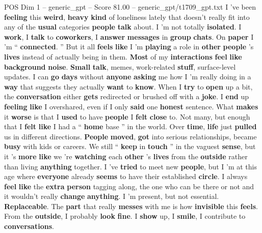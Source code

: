 \begin{textsample}{POS Dim 1 – generic\_gpt – Score 81.00 – generic\_gpt/t1709\_gpt.txt}  \label{ex:f1_pos_007}
I ’ve been \textbf{feeling} this \textbf{weird}, \textbf{heavy} \textbf{kind} of loneliness lately that doesn't really fit into any of the \textbf{usual} categories \textbf{people} \textbf{talk} about.
I ’m not totally \textbf{isolated}.
I \textbf{work}, I \textbf{talk} to \textbf{coworkers}, I \textbf{answer} \textbf{messages} in \textbf{group} \textbf{chats}.
On \textbf{paper} I ’m “ \textbf{connected}. ” But it all \textbf{feels} \textbf{like} I ’m \textbf{playing} a role in \textbf{other} \textbf{people} ’s \textbf{lives} instead of actually being in them. \textbf{Most} of my \textbf{interactions} \textbf{feel} \textbf{like} \textbf{background} \textbf{noise}. \textbf{Small} \textbf{talk}, memes, work-related \textbf{stuff}, surface-level updates.
I can \textbf{go} \textbf{days} without \textbf{anyone} \textbf{asking} me how I ’m really doing in a \textbf{way} that suggests they actually \textbf{want} to \textbf{know}.
When I \textbf{try} to \textbf{open} up a bit, the \textbf{conversation} either \textbf{gets} redirected or brushed off with a \textbf{joke}.
I \textbf{end} up \textbf{feeling} \textbf{like} I overshared, even if I only \textbf{said} one \textbf{honest} sentence.
What \textbf{makes} it \textbf{worse} is that I \textbf{used} to have \textbf{people} I \textbf{felt} \textbf{close} to.
Not many, but enough that I \textbf{felt} \textbf{like} I had a “ \textbf{home} base ” in the world.
Over \textbf{time}, \textbf{life} just \textbf{pulled} us in different directions. \textbf{People} \textbf{moved}, \textbf{got} into serious relationships, became \textbf{busy} with kids or careers.
We still “ \textbf{keep} in \textbf{touch} ” in the vaguest \textbf{sense}, but it ’s \textbf{more} \textbf{like} we ’re \textbf{watching} each \textbf{other} ’s \textbf{lives} from the \textbf{outside} rather than living \textbf{anything} together.
I ’ve \textbf{tried} to meet new \textbf{people}, but I ’m at this age where \textbf{everyone} already \textbf{seems} to have their established \textbf{circle}.
I always \textbf{feel} \textbf{like} the \textbf{extra} \textbf{person} tagging along, the one who can be there or not and it wouldn't really \textbf{change} \textbf{anything}.
I ’m present, but not essential. \textbf{Replaceable}.
The \textbf{part} that really \textbf{messes} with me is how \textbf{invisible} this \textbf{feels}.
From the \textbf{outside}, I probably \textbf{look} \textbf{fine}.
I \textbf{show} up, I \textbf{smile}, I contribute to \textbf{conversations}.

\end{textsample}
